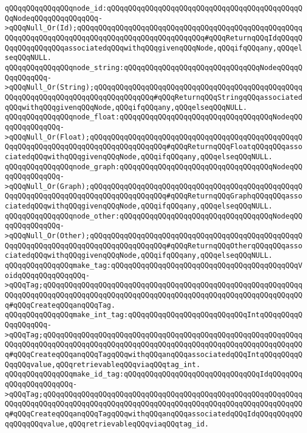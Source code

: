 \verb|qQQqqQQqqQQqqQQqnode_id:qQQqqQQqqQQqqQQqqQQqqQQqqQQqqQQqqQQqqQQqqQQqqQQqNodeqQQqqQQqqQQqqQQq->qQQqNull_Or(Id);qQQqqQQqqQQqqQQqqQQqqQQqqQQqqQQqqQQqqQQqqQQqqQQqqQQqqQQqqQQqqQQqqQQqqQQqqQQqqQQqqQQqqQQqqQQqqQQqqQQq#qQQqReturnqQQqIdqQQqqQQqqQQqqQQqqQQqassociatedqQQqwithqQQqgivenqQQqNode,qQQqifqQQqany,qQQqelseqQQqNULL.|\newline
\verb|qQQqqQQqqQQqqQQqnode_string:qQQqqQQqqQQqqQQqqQQqqQQqqQQqqQQqNodeqQQqqQQqqQQqqQQq->qQQqNull_Or(String);qQQqqQQqqQQqqQQqqQQqqQQqqQQqqQQqqQQqqQQqqQQqqQQqqQQqqQQqqQQqqQQqqQQqqQQqqQQqqQQqqQQq#qQQqReturnqQQqStringqQQqassociatedqQQqwithqQQqgivenqQQqNode,qQQqifqQQqany,qQQqelseqQQqNULL.|\newline
\verb|qQQqqQQqqQQqqQQqnode_float:qQQqqQQqqQQqqQQqqQQqqQQqqQQqqQQqqQQqNodeqQQqqQQqqQQqqQQq->qQQqNull_Or(Float);qQQqqQQqqQQqqQQqqQQqqQQqqQQqqQQqqQQqqQQqqQQqqQQqqQQqqQQqqQQqqQQqqQQqqQQqqQQqqQQqqQQqqQQq#qQQqReturnqQQqFloatqQQqqQQqassociatedqQQqwithqQQqgivenqQQqNode,qQQqifqQQqany,qQQqelseqQQqNULL.|\newline
\verb|qQQqqQQqqQQqqQQqnode_graph:qQQqqQQqqQQqqQQqqQQqqQQqqQQqqQQqqQQqNodeqQQqqQQqqQQqqQQq->qQQqNull_Or(Graph);qQQqqQQqqQQqqQQqqQQqqQQqqQQqqQQqqQQqqQQqqQQqqQQqqQQqqQQqqQQqqQQqqQQqqQQqqQQqqQQqqQQqqQQq#qQQqReturnqQQqGraphqQQqqQQqassociatedqQQqwithqQQqgivenqQQqNode,qQQqifqQQqany,qQQqelseqQQqNULL.|\newline
\verb|qQQqqQQqqQQqqQQqnode_other:qQQqqQQqqQQqqQQqqQQqqQQqqQQqqQQqqQQqNodeqQQqqQQqqQQqqQQq->qQQqNull_Or(Other);qQQqqQQqqQQqqQQqqQQqqQQqqQQqqQQqqQQqqQQqqQQqqQQqqQQqqQQqqQQqqQQqqQQqqQQqqQQqqQQqqQQqqQQq#qQQqReturnqQQqOtherqQQqqQQqassociatedqQQqwithqQQqgivenqQQqNode,qQQqifqQQqany,qQQqelseqQQqNULL.|\newline
\newline
\verb|qQQqqQQqqQQqqQQqmake_tag:qQQqqQQqqQQqqQQqqQQqqQQqqQQqqQQqqQQqqQQqqQQqVoidqQQqqQQqqQQqqQQq->qQQqTag;qQQqqQQqqQQqqQQqqQQqqQQqqQQqqQQqqQQqqQQqqQQqqQQqqQQqqQQqqQQqqQQqqQQqqQQqqQQqqQQqqQQqqQQqqQQqqQQqqQQqqQQqqQQqqQQqqQQqqQQqqQQqqQQqqQQq#qQQqCreateqQQqanqQQqTag.|\newline
\verb|qQQqqQQqqQQqqQQqmake_int_tag:qQQqqQQqqQQqqQQqqQQqqQQqqQQqIntqQQqqQQqqQQqqQQqqQQq->qQQqTag;qQQqqQQqqQQqqQQqqQQqqQQqqQQqqQQqqQQqqQQqqQQqqQQqqQQqqQQqqQQqqQQqqQQqqQQqqQQqqQQqqQQqqQQqqQQqqQQqqQQqqQQqqQQqqQQqqQQqqQQqqQQqqQQqqQQq#qQQqCreateqQQqanqQQqTagqQQqwithqQQqanqQQqassociatedqQQqIntqQQqqQQqqQQqqQQqvalue,qQQqretrievableqQQqviaqQQqtag_int.|\newline
\verb|qQQqqQQqqQQqqQQqmake_id_tag:qQQqqQQqqQQqqQQqqQQqqQQqqQQqqQQqIdqQQqqQQqqQQqqQQqqQQqqQQq->qQQqTag;qQQqqQQqqQQqqQQqqQQqqQQqqQQqqQQqqQQqqQQqqQQqqQQqqQQqqQQqqQQqqQQqqQQqqQQqqQQqqQQqqQQqqQQqqQQqqQQqqQQqqQQqqQQqqQQqqQQqqQQqqQQqqQQqqQQq#qQQqCreateqQQqanqQQqTagqQQqwithqQQqanqQQqassociatedqQQqIdqQQqqQQqqQQqqQQqqQQqvalue,qQQqretrievableqQQqviaqQQqtag_id.|\newline
